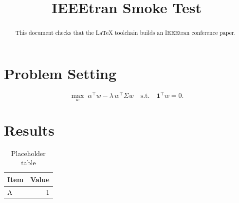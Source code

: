 \documentclass[conference]{IEEEtran}
\begin{document}
\title{IEEEtran Smoke Test}
\author{}
\maketitle

\begin{abstract}
This document checks that the LaTeX toolchain builds an IEEEtran conference paper.
\end{abstract}

\section{Problem Setting}
\begin{equation}
  \max_{w}\; \alpha^\top w - \lambda\, w^\top \Sigma w
  \quad \text{s.t.}\quad \mathbf{1}^\top w = 0.
\end{equation}

\section{Results}
\begin{table}[h]
  \centering
  \caption{Placeholder table}
  \begin{tabular}{lr}
    \toprule
    Item & Value \\
    \midrule
    A & 1 \\
    \bottomrule
  \end{tabular}
\end{table}
\end{document}
